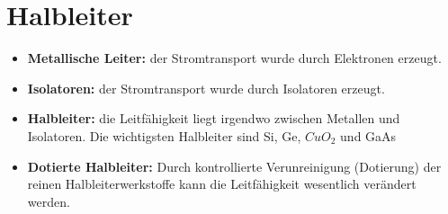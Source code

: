\section{Halbleiter}
\begin{itemize}
    \item \textbf{Metallische Leiter:} der Stromtransport wurde durch Elektronen erzeugt.
    \item \textbf{Isolatoren:} der Stromtransport wurde durch Isolatoren erzeugt.
    \item \textbf{Halbleiter:} die Leitfähigkeit liegt irgendwo zwischen Metallen und Isolatoren.
    \subitem  Die wichtigsten Halbleiter sind  Si, Ge, $CuO_2$ und GaAs 
    \item \textbf{Dotierte Halbleiter:} Durch kontrollierte Verunreinigung (Dotierung) der reinen Halbleiterwerkstoffe kann die Leitfähigkeit wesentlich verändert werden.
\end{itemize}

